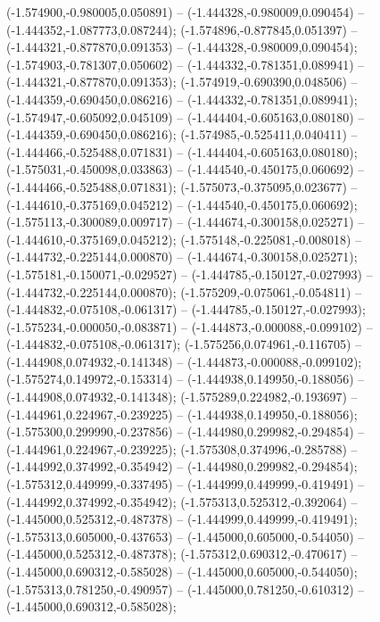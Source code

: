  (-1.574900,-0.980005,0.050891) -- (-1.444328,-0.980009,0.090454) -- (-1.444352,-1.087773,0.087244);
 (-1.574896,-0.877845,0.051397) -- (-1.444321,-0.877870,0.091353) -- (-1.444328,-0.980009,0.090454);
 (-1.574903,-0.781307,0.050602) -- (-1.444332,-0.781351,0.089941) -- (-1.444321,-0.877870,0.091353);
 (-1.574919,-0.690390,0.048506) -- (-1.444359,-0.690450,0.086216) -- (-1.444332,-0.781351,0.089941);
 (-1.574947,-0.605092,0.045109) -- (-1.444404,-0.605163,0.080180) -- (-1.444359,-0.690450,0.086216);
 (-1.574985,-0.525411,0.040411) -- (-1.444466,-0.525488,0.071831) -- (-1.444404,-0.605163,0.080180);
 (-1.575031,-0.450098,0.033863) -- (-1.444540,-0.450175,0.060692) -- (-1.444466,-0.525488,0.071831);
 (-1.575073,-0.375095,0.023677) -- (-1.444610,-0.375169,0.045212) -- (-1.444540,-0.450175,0.060692);
 (-1.575113,-0.300089,0.009717) -- (-1.444674,-0.300158,0.025271) -- (-1.444610,-0.375169,0.045212);
 (-1.575148,-0.225081,-0.008018) -- (-1.444732,-0.225144,0.000870) -- (-1.444674,-0.300158,0.025271);
 (-1.575181,-0.150071,-0.029527) -- (-1.444785,-0.150127,-0.027993) -- (-1.444732,-0.225144,0.000870);
 (-1.575209,-0.075061,-0.054811) -- (-1.444832,-0.075108,-0.061317) -- (-1.444785,-0.150127,-0.027993);
 (-1.575234,-0.000050,-0.083871) -- (-1.444873,-0.000088,-0.099102) -- (-1.444832,-0.075108,-0.061317);
 (-1.575256,0.074961,-0.116705) -- (-1.444908,0.074932,-0.141348) -- (-1.444873,-0.000088,-0.099102);
 (-1.575274,0.149972,-0.153314) -- (-1.444938,0.149950,-0.188056) -- (-1.444908,0.074932,-0.141348);
 (-1.575289,0.224982,-0.193697) -- (-1.444961,0.224967,-0.239225) -- (-1.444938,0.149950,-0.188056);
 (-1.575300,0.299990,-0.237856) -- (-1.444980,0.299982,-0.294854) -- (-1.444961,0.224967,-0.239225);
 (-1.575308,0.374996,-0.285788) -- (-1.444992,0.374992,-0.354942) -- (-1.444980,0.299982,-0.294854);
 (-1.575312,0.449999,-0.337495) -- (-1.444999,0.449999,-0.419491) -- (-1.444992,0.374992,-0.354942);
 (-1.575313,0.525312,-0.392064) -- (-1.445000,0.525312,-0.487378) -- (-1.444999,0.449999,-0.419491);
 (-1.575313,0.605000,-0.437653) -- (-1.445000,0.605000,-0.544050) -- (-1.445000,0.525312,-0.487378);
 (-1.575312,0.690312,-0.470617) -- (-1.445000,0.690312,-0.585028) -- (-1.445000,0.605000,-0.544050);
 (-1.575313,0.781250,-0.490957) -- (-1.445000,0.781250,-0.610312) -- (-1.445000,0.690312,-0.585028);
